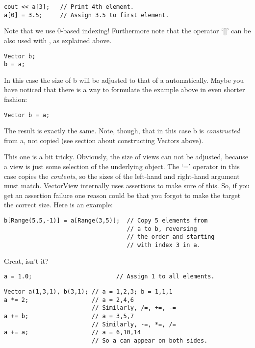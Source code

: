 \begin{verbatim}
cout << a[3];   // Print 4th element.
a[0] = 3.5;     // Assign 3.5 to first element.
\end{verbatim}

Note that we use 0-based indexing! Furthermore note that the operator
`[]' can be also used with , as explained above.

\begin{verbatim}
Vector b;
b = a;
\end{verbatim}
In this case the size of b will be adjusted to that of a
automatically. Maybe you have noticed that there is a way to formulate the 
example above in even shorter fashion:
\begin{verbatim}
Vector b = a;
\end{verbatim}
The result is exactly the same. Note, though, that in this case b is
\emph{constructed} from a, not copied (see section about constructing
Vectors above). 

This one is a bit tricky. Obviously, the size of views can not be
adjusted, because a view is just some selection of the underlying
object. The `=' operator in this case copies the
\emph{contents}, so the sizes of the left-hand and right-hand argument
must match. VectorView internally uses assertions to make sure of
this. So, if you get an assertion failure one reason could be that you
forgot to make the target the correct size. Here is an example:
\begin{verbatim}
b[Range(5,5,-1)] = a[Range(3,5)];  // Copy 5 elements from 
                                   // a to b, reversing 
                                   // the order and starting
                                   // with index 3 in a.
\end{verbatim}
Great, isn't it?

\begin{verbatim}
a = 1.0;                        // Assign 1 to all elements.
\end{verbatim}

\begin{verbatim}
Vector a(1,3,1), b(3,1); // a = 1,2,3; b = 1,1,1
a *= 2;                  // a = 2,4,6
                         // Similarly, /=, +=, -=
a += b;                  // a = 3,5,7
                         // Similarly, -=, *=, /=
a += a;                  // a = 6,10,14
                         // So a can appear on both sides.
\end{verbatim}

